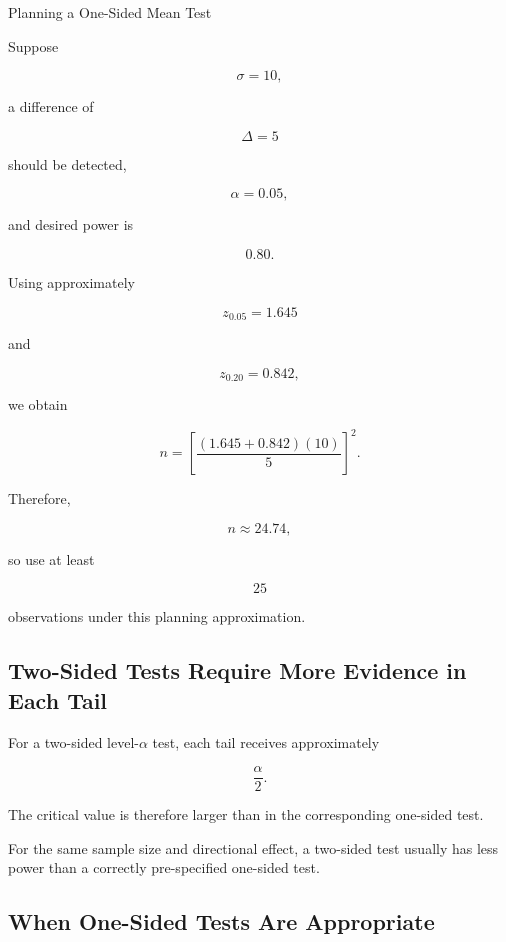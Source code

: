 \begin{workedexamplebox}{Planning a One-Sided Mean Test}

Suppose

\[
\sigma=10,
\]

a difference of

\[
\Delta=5
\]

should be detected,

\[
\alpha=0.05,
\]

and desired power is

\[
0.80.
\]

Using approximately

\[
z_{0.05}=1.645
\]

and

\[
z_{0.20}=0.842,
\]

we obtain

\[
n
=
\left[
\frac{
(1.645+0.842)(10)
}{
5
}
\right]^2.
\]

Therefore,

\begin{answerbox}
\[
\boxed{
n
\approx
24.74,
}
\]

so use at least

\[
\boxed{
25
}
\]

observations under this planning approximation.
\end{answerbox}

\end{workedexamplebox}

\subsection{Two-Sided Tests Require More Evidence in Each Tail}
\label{subsec:two-sided-power}

For a two-sided level-\(\alpha\) test, each tail receives approximately

\[
\frac{\alpha}{2}.
\]

The critical value is therefore larger than in the corresponding
one-sided test.

For the same sample size and directional effect, a two-sided test usually
has less power than a correctly pre-specified one-sided test.

\subsection{When One-Sided Tests Are Appropriate}
\label{subsec:when-one-sided}

